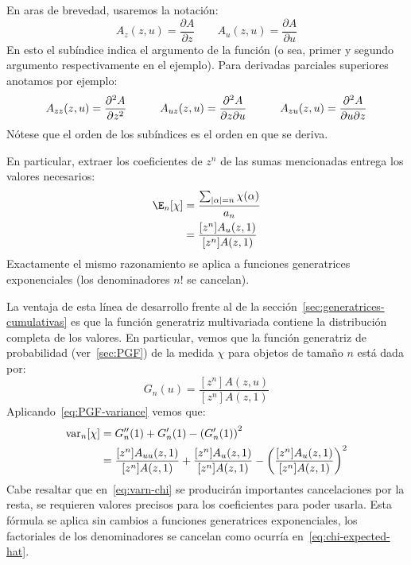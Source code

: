   En aras de brevedad,
  usaremos la notación:%
  \begin{equation}
    \label{eq:partial-notation}
    A_z(z, u)
      = \frac{\partial A}{\partial z}
    \qquad
    A_u(z, u)
      = \frac{\partial A}{\partial u}
  \end{equation}
  En esto el subíndice indica el argumento de la función
  (o sea,
   primer y segundo argumento respectivamente en el ejemplo).
  Para derivadas parciales superiores anotamos por ejemplo:
  \begin{equation*}
    A_{z z}(z, u)
      = \frac{\partial^2 A}{\partial z^2}
    \hspace*{3em}
    A_{u z}(z, u)
      = \frac{\partial^2 A}{\partial z \partial u}
    \hspace*{3em}
    A_{z u}(z, u)
      = \frac{\partial^2 A}{\partial u \partial z}
  \end{equation*}
  Nótese que el orden de los subíndices es el orden en que se deriva.

  En particular,
  extraer los coeficientes de \(z^n\) de las sumas mencionadas
  entrega los valores necesarios:%
  \begin{align}
    \E_n[\chi]
      &= \frac{\sum_{\lvert \alpha \rvert = n} \chi(\alpha)}{a_n}
	   \label{eq:En-def} \\
      &= \frac{[z^n] A_u(z, 1)}{[z^n] A(z, 1)}
	   \label{eq:En-value}
  \end{align}
  Exactamente el mismo razonamiento
  se aplica a funciones generatrices exponenciales
  (los denominadores \(n!\) se cancelan).

  La ventaja de esta línea de desarrollo
  frente al de la sección~\ref{sec:generatrices-cumulativas}
  es que la función generatriz multivariada contiene la distribución completa
  de los valores.
  En particular,
  vemos que la función generatriz de probabilidad
  (ver~\ref{sec:PGF})
  de la medida \(\chi\) para objetos de tamaño \(n\) está dada por:
  \begin{equation}
    \label{eq:PGF-chi}
    G_n(u)
      = \frac{[z^n] A(z, u)}{[z^n] A(z, 1)}
  \end{equation}
  Aplicando~\eqref{eq:PGF-variance} vemos que:%
  \begin{align}
    \operatorname{var}_n[\chi]
      &= G_n''(1) + G_n'(1) - \left( G_n'(1) \right)^2 \\
      &= \frac{[z^n] A_{u u} (z, 1)}{[z^n] A(z, 1)}
	    + \frac{[z^n] A_u (z, 1)}{[z^n] A(z, 1)}
	    - \left( \frac{[z^n] A_u (z, 1)}{[z^n] A(z, 1)} \right)^2
		 \label{eq:varn-chi}
  \end{align}
  Cabe resaltar que en~\eqref{eq:varn-chi}
  se producirán importantes cancelaciones por la resta,
  se requieren valores precisos para los coeficientes
  para poder usarla.
  Esta fórmula se aplica sin cambios a funciones generatrices exponenciales,
  los factoriales de los denominadores se cancelan
  como ocurría en~\eqref{eq:chi-expected-hat}.

